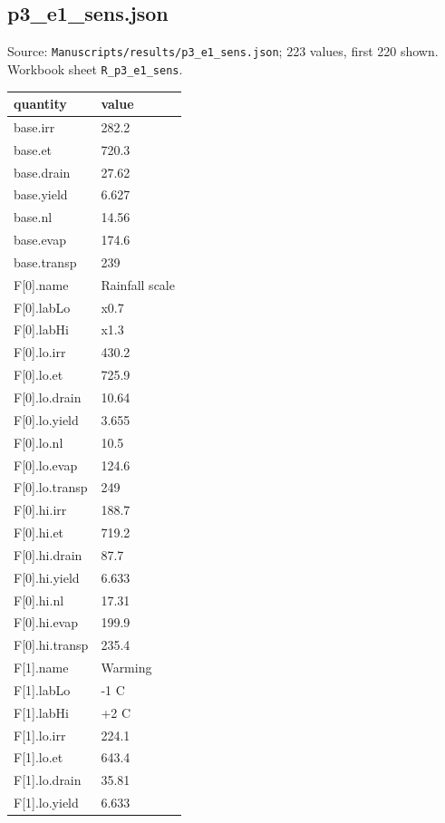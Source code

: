 \subsection*{p3\_e1\_sens.json}
\noindent\small Source: \nolinkurl{Manuscripts/results/p3_e1_sens.json}; 223 values, first 220 shown. Workbook sheet \texttt{R\_p3\_e1\_sens}.\par
{\scriptsize\begin{longtable}{p{}p{}}\toprule\textbf{quantity} & \textbf{value}\\\midrule\endhead
{}base.irr & 282.2\\
{}base.et & 720.3\\
{}base.drain & 27.62\\
{}base.yield & 6.627\\
{}base.nl & 14.56\\
{}base.evap & 174.6\\
{}base.transp & 239\\
{}F[0].name & Rainfall scale\\
{}F[0].labLo & x0.7\\
{}F[0].labHi & x1.3\\
{}F[0].lo.irr & 430.2\\
{}F[0].lo.et & 725.9\\
{}F[0].lo.drain & 10.64\\
{}F[0].lo.yield & 3.655\\
{}F[0].lo.nl & 10.5\\
{}F[0].lo.evap & 124.6\\
{}F[0].lo.transp & 249\\
{}F[0].hi.irr & 188.7\\
{}F[0].hi.et & 719.2\\
{}F[0].hi.drain & 87.7\\
{}F[0].hi.yield & 6.633\\
{}F[0].hi.nl & 17.31\\
{}F[0].hi.evap & 199.9\\
{}F[0].hi.transp & 235.4\\
{}F[1].name & Warming\\
{}F[1].labLo & -1 C\\
{}F[1].labHi & +2 C\\
{}F[1].lo.irr & 224.1\\
{}F[1].lo.et & 643.4\\
{}F[1].lo.drain & 35.81\\
{}F[1].lo.yield & 6.633\\

\end{longtable}}
